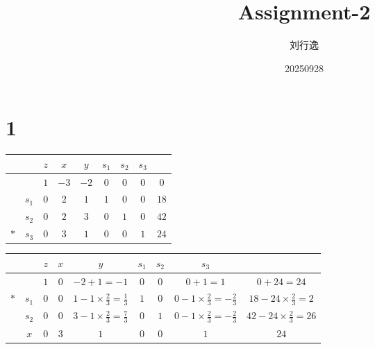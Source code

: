 \documentclass[a4paper,12pt]{article}
\title{Assignment-2}
\author{刘行逸}
\date{20250928}
\begin{document}
\maketitle

\section*{1}
\begin{table}[H]
    \scriptsize
    \begin{tabular}{cc|cccccc|c}
            &       & $z$ & $x$  & $y$  & $s_1$ & $s_2$ & $s_3$ &      \\
        \hline
            &       & $1$ & $-3$ & $-2$ & $0$   & $0$   & $0$   & $0$  \\
        \hline
            & $s_1$ & $0$ & $2$  & $1$  & $1$   & $0$   & $0$   & $18$ \\
            & $s_2$ & $0$ & $2$  & $3$  & $0$   & $1$   & $0$   & $42$ \\
        $*$ & $s_3$ & $0$ & $3$  & $1$  & $0$   & $0$   & $1$   & $24$ \\
    \end{tabular}
\end{table}

\begin{table}[H]
    \scriptsize
    \begin{tabular}{cc|cccccc|c}
            &       & $z$ & $x$ & $y$                                      & $s_1$ & $s_2$ & $s_3$                                     &                                   \\
        \hline
            &       & $1$ & $0$ & $-2 + 1 = -1$                            & $0$   & $0$   & $0 + 1 = 1$                               & $0 + 24 = 24$                     \\
        \hline
        $*$ & $s_1$ & $0$ & $0$ & $1 - 1 \times \frac{2}{3} = \frac{1}{3}$ & $1$   & $0$   & $0 - 1 \times \frac{2}{3} = -\frac{2}{3}$ & $18 - 24 \times \frac{2}{3} = 2$  \\
            & $s_2$ & $0$ & $0$ & $3 - 1 \times \frac{2}{3} = \frac{7}{3}$ & $0$   & $1$   & $0 - 1 \times \frac{2}{3} = -\frac{2}{3}$ & $42 - 24 \times \frac{2}{3} = 26$ \\
            & $x$   & $0$ & $3$ & $1$                                      & $0$   & $0$   & $1$                                       & $24$                              \\
    \end{tabular}
\end{table}
\end{document}
